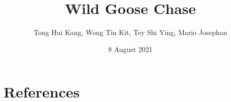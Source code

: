 \documentclass{article}
\title{Wild Goose Chase}
\author{Tong Hui Kang, Wong Tin Kit, Tey Shi Ying, Mario Josephan}
\date{8 August 2021}
\begin{document}
\maketitle



\tableofcontents

\pagebreak



















\section{References}


\end{document}
